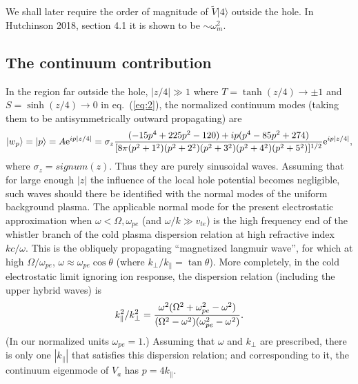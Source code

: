\documentclass[12pt]{article}
\def\ket#1{|#1\rangle}
\def\etothe#1{{\rm e}^{#1}}
\begin{document}
We shall later require  the order of magnitude of $\tilde V\ket{4}$
outside the hole.  In Hutchinson 2018,
section 4.1 it is shown to be $\sim \omega_m^2$.


\subsection{The continuum contribution}

In the region far outside the hole, $|z/4|\gg 1$ where
$T=\tanh(z/4)\to\pm1$ and $S=\sinh(z/4)\to0$ in eq.\ (\ref{eq:2}), the
normalized continuum modes (taking them to be antisymmetrically
outward propagating) are
\begin{equation}
  \label{eq:14}
 \ket{w_p}= \ket{p}=A\etothe{ip|z/4|}=\sigma_z{(-15p^4+225p^2-120) +ip (p^{4}-85p^{2}+274)\over
      [8\pi(p^2+1^2)(p^2+2^2)(p^2+3^2)(p^2+4^2)(p^2+5^2)]^{1/2}}\etothe{ip|z/4|},
\end{equation}
where $\sigma_z=signum(z)$. Thus they are purely sinusoidal
waves. Assuming that for large enough $|z|$ the influence of the local
hole potential becomes negligible, such waves should there be
identified with the normal modes of the uniform background plasma.
The applicable normal mode for the present electrostatic approximation
when $\omega<\Omega,\omega_{pe}$ (and $\omega/k\gg v_{te}$) is the high
frequency end of the whistler branch of the cold plasma dispersion
relation at high refractive index $kc/\omega$. This is the obliquely
propagating ``magnetized langmuir wave'', for which at high
$\Omega/\omega_{pe}$, 
$\omega\approx\omega_{pe}\cos\theta$ (where
$k_\perp/k_\parallel=\tan\theta$). More completely, in the cold
electrostatic limit ignoring ion response, the dispersion relation
(including the upper hybrid waves) is
\begin{equation}
  \label{eq:15}
  k_\parallel^2/k_\perp^2={\omega^2(\Omega^2+\omega_{pe}^2-\omega^2)
    \over(\Omega^2-\omega^2)(\omega_{pe}^2-\omega^2)}.
\end{equation}
(In our normalized units $\omega_{pe}=1$.)  Assuming that $\omega$ and
$k_\perp$ are prescribed, there is only one $|k_\parallel|$ that
satisfies this dispersion relation; and corresponding to it, the
continuum eigenmode of $V_a$ has $p=4k_\parallel$.
\end{document}
